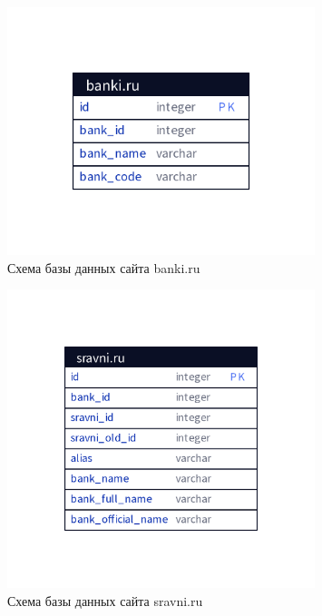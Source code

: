 \documentclass[PI, VKR]{HSEUniversity}
\begin{document}
\begin{figure}[h!]
\centering
\includegraphics[width=0.8\textwidth]{img/d2/banki_ru.png}
\caption{\label{fig:database_banki_ru}Схема базы данных сайта banki.ru}
\end{figure}

\begin{figure}[h!]
\centering
\includegraphics[width=0.8\textwidth]{img/d2/sravni_ru.png}
\caption{\label{fig:database_sravni_ru}Схема базы данных сайта sravni.ru}
\end{figure}
\end{document}
